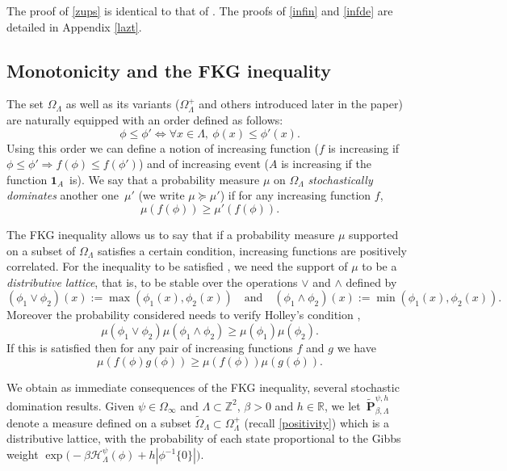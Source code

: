 \documentclass[10pt]{amsart}
\let\mathcal\mathscr
\numberwithin{equation}{section}
\theoremstyle{plain}
\theoremstyle{definition}
\newcommand{\ind}{\mathbf{1}}
\newcommand{\cH}{{\ensuremath{\mathcal H}} }
\newcommand{\bP}{{\ensuremath{\mathbf P}} }
\newcommand{\bbR}{{\ensuremath{\mathbb R}} }
\newcommand{\bbZ}{{\ensuremath{\mathbb Z}} }
\newcommand{\gb}{\beta}
\newcommand{\gO}{\Omega}
\newcommand{\gL}{\Lambda}
\begin{document}
The proof of \eqref{zups} is identical to that of \cite[Prop.\,4.5]{cf:part1}. The proofs of \eqref{infin} and \eqref{infde} are detailed in Appendix \ref{lazt}.

\subsection{Monotonicity and the FKG inequality}

The set $\gO_{\gL}$ as well as its variants ($\gO^+_{\gL}$ and others introduced later in the paper) are naturally equipped with an order defined as follows:
\[
\phi\le \phi' \iff \forall x\in \gL,\ \phi(x)\le \phi'(x).
\]
Using this order we can define a notion of increasing function ($f$ is increasing if $\phi\le \phi'\Rightarrow f(\phi)\le f(\phi')$) and of increasing event
($A$ is increasing if the function $\ind_A$~is).
We say that a probability measure $\mu$ on $\gO_{\gL}$ \textit{stochastically dominates} another one~$\mu'$ (we write $\mu \succcurlyeq \mu'$) if for any increasing function $f$,
\[
\mu(f(\phi))\ge \mu'(f(\phi)).
\]

The FKG inequality allows us to say that if a probability measure $\mu$ supported on a subset of $\gO_{\gL}$ satisfies a certain condition,
increasing functions are positively correlated.
For the inequality to be satisfied \cite{cf:Holley}, we need the support of $\mu$ to be a \textit{distributive lattice}, that is, to
be stable over the operations $\vee$ and $\wedge$
defined by
\[
(\phi_1\vee \phi_2)(x):=\max(\phi_1(x),\phi_2(x)) \quad\text{and}\quad(\phi_1\wedge \phi_2)(x):=\min(\phi_1(x),\phi_2(x)).
\]
Moreover the probability considered needs to verify Holley's condition \cite[Eq.\,(7)]{cf:Holley},
\begin{equation*}%
\mu(\phi_1\vee \phi_2) \mu(\phi_1\wedge \phi_2)\ge \mu(\phi_1)\mu(\phi_2).
\end{equation*}
If this is satisfied then for any pair of increasing functions $f$ and $g$ we have
\begin{equation*}%
\mu(f(\phi)g(\phi))\ge \mu(f(\phi)) \mu(g(\phi)).
\end{equation*}

We obtain as immediate consequences of the FKG inequality, several stochastic domination results.
Given $\psi\in \gO_{\infty}$ and $\gL\subset \bbZ^2$, $\gb>0$ and $h\in \bbR$,
we let~$\tilde \bP^{\psi,h}_{\gb,\gL}$ denote a measure defined on a subset $\tilde \gO_\gL \subset \gO^+_{\gL}$ (recall \eqref{positivity}) which is a
distributive lattice, with the probability of each state proportional to the Gibbs weight
\hbox{$\exp\bigl(-\gb\cH^\psi_\gL(\phi)+ h|\phi^{-1}\{0\}|\bigr)$}.
\end{document}
